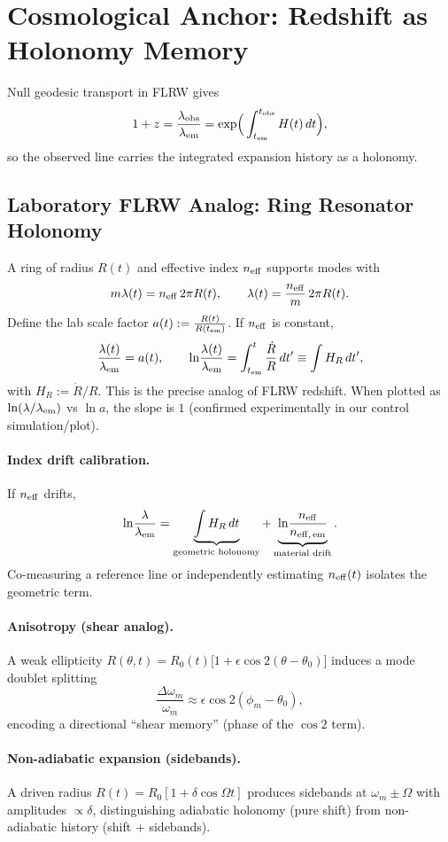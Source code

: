 \documentclass[11pt]{article}
\begin{document}
\section{Cosmological Anchor: Redshift as Holonomy Memory}
Null geodesic transport in FLRW gives
\[
1+z = \frac{\lambda_{\rm obs}}{\lambda_{\rm em}} = \exp\!\Big(\int_{t_{\rm em}}^{t_{\rm obs}} H(t)\,dt\Big),
\]
so the observed line carries the integrated expansion history as a holonomy.

\subsection*{Laboratory FLRW Analog: Ring Resonator Holonomy}
A ring of radius $R(t)$ and effective index $n_{\rm eff}$ supports modes with
\[
m\lambda(t) = n_{\rm eff}\,2\pi R(t),\qquad
\lambda(t) = \frac{n_{\rm eff}}{m}\,2\pi R(t).
\]
Define the lab scale factor $a(t):=\frac{R(t)}{R(t_{\rm em})}$.
If $n_{\rm eff}$ is constant,
\[
\frac{\lambda(t)}{\lambda_{\rm em}} = a(t), \qquad
\ln\!\frac{\lambda(t)}{\lambda_{\rm em}} = \int_{t_{\rm em}}^{t} \frac{\dot R}{R}\,dt' \equiv \int H_R\,dt',
\]
with $H_R:=\dot R/R$. This is the precise analog of FLRW redshift. When plotted as
$\ln(\lambda/\lambda_{\rm em})$ vs $\ln a$, the slope is $1$ (confirmed experimentally in our control simulation/plot).

\paragraph{Index drift calibration.}
If $n_{\rm eff}$ drifts,
\[
\ln\!\frac{\lambda}{\lambda_{\rm em}} = \underbrace{\int H_R\,dt}_{\text{geometric holonomy}} + \underbrace{\ln\!\frac{n_{\rm eff}}{n_{{\rm eff},\,{\rm em}}}}_{\text{material drift}}.
\]
Co-measuring a reference line or independently estimating $n_{\rm eff}(t)$ isolates the geometric term.

\paragraph{Anisotropy (shear analog).}
A weak ellipticity $R(\theta,t)=R_0(t)\big[1+\epsilon\cos 2(\theta-\theta_0)\big]$ induces a mode doublet splitting
\[
\frac{\Delta\omega_m}{\omega_m}\approx \epsilon\cos 2(\phi_m-\theta_0),
\]
encoding a directional ``shear memory'' (phase of the $\cos2$ term).

\paragraph{Non-adiabatic expansion (sidebands).}
A driven radius $R(t)=R_0[1+\delta\cos\Omega t]$ produces sidebands at $\omega_m\pm\Omega$ with amplitudes $\propto \delta$,
distinguishing adiabatic holonomy (pure shift) from non-adiabatic history (shift + sidebands).
\end{document}
